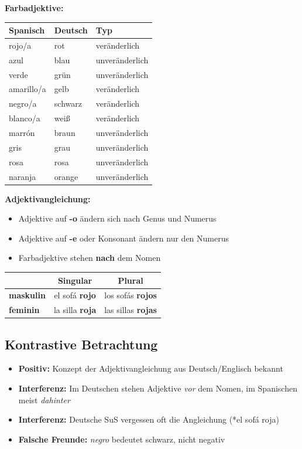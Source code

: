 \documentclass[11pt,a4paper]{article}
\begin{document}
\textbf{Farbadjektive:}
\begin{center}
\begin{tabular}{|l|l|l|}
\hline
\textbf{Spanisch} & \textbf{Deutsch} & \textbf{Typ} \\
\hline
rojo/a & rot & veränderlich \\
\hline
azul & blau & unveränderlich \\
\hline
verde & grün & unveränderlich \\
\hline
amarillo/a & gelb & veränderlich \\
\hline
negro/a & schwarz & veränderlich \\
\hline
blanco/a & weiß & veränderlich \\
\hline
marrón & braun & unveränderlich \\
\hline
gris & grau & unveränderlich \\
\hline
rosa & rosa & unveränderlich \\
\hline
naranja & orange & unveränderlich \\
\hline
\end{tabular}
\end{center}

\textbf{Adjektivangleichung:}
\begin{itemize}
    \item Adjektive auf \textbf{-o} ändern sich nach Genus und Numerus
    \item Adjektive auf \textbf{-e} oder Konsonant ändern nur den Numerus
    \item Farbadjektive stehen \textbf{nach} dem Nomen
\end{itemize}

\begin{center}
\begin{tabular}{|l|c|c|}
\hline
& \textbf{Singular} & \textbf{Plural} \\
\hline
\textbf{maskulin} & el sofá \textbf{rojo} & los sofás \textbf{rojos} \\
\hline
\textbf{feminin} & la silla \textbf{roja} & las sillas \textbf{rojas} \\
\hline
\end{tabular}
\end{center}

\subsection{Kontrastive Betrachtung}
\begin{itemize}
    \item \textbf{Positiv:} Konzept der Adjektivangleichung aus Deutsch/Englisch bekannt
    \item \textbf{Interferenz:} Im Deutschen stehen Adjektive \textit{vor} dem Nomen, im Spanischen meist \textit{dahinter}
    \item \textbf{Interferenz:} Deutsche SuS vergessen oft die Angleichung (*el sofá roja)
    \item \textbf{Falsche Freunde:} \textit{negro} bedeutet schwarz, nicht negativ
\end{itemize}
\end{document}
